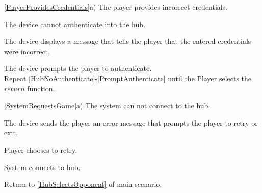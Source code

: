 \documentclass[12pt]{article}
\newenvironment{enumerate*}%
  {\begin{enumerate}%
  	\setlength{\parsep}{0pt}
    \setlength{\itemsep}{0pt}%
    \setlength{\parskip}{0pt}}%
  {\end{enumerate}}
\begin{document}
\ref{PlayerProvidesCredentials}a) The player provides incorrect credentials.
\begin{enumerate*}
\item \label{HubNoAuthenticate}The device cannot authenticate into the hub.
\item The device displays a message that tells the player that the entered credentials were incorrect.
\item \label{PromptAuthenticate}The device prompts the player to authenticate.\\
Repeat \ref{HubNoAuthenticate}-\ref{PromptAuthenticate} until the Player selects the $return$ function.
\end{enumerate*}
\ref{SystemRequestsGame}a) The system can not connect to the hub.
\begin{enumerate*}
\item The device sends the player an error message that prompts the player to retry or exit.
\item Player chooses to retry.
\item System connects to hub.
\item Return to \ref{HubSelectsOpponent} of main scenario.
\end{enumerate*}
\end{document}
